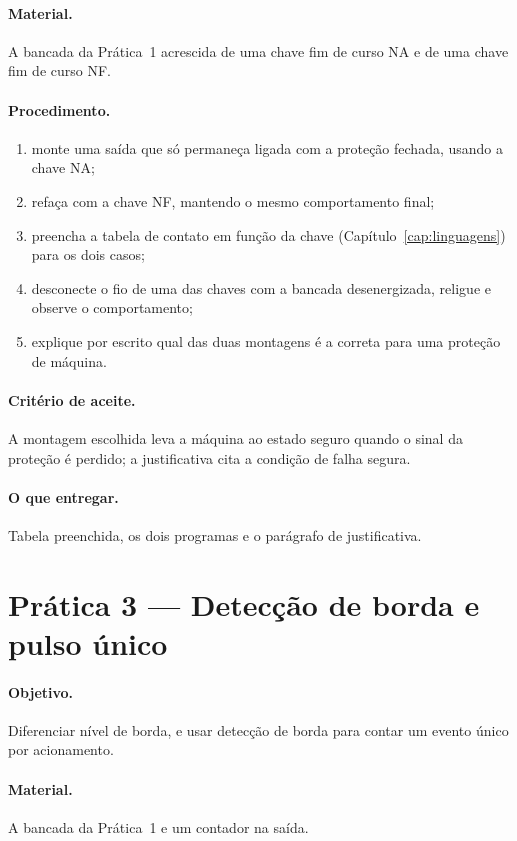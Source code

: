 \paragraph{Material.} A bancada da Prática~1 acrescida de uma chave fim de curso NA e de uma chave
fim de curso NF.

\paragraph{Procedimento.}
\begin{enumerate}
  \item monte uma saída que só permaneça ligada com a proteção fechada, usando a chave NA;
  \item refaça com a chave NF, mantendo o mesmo comportamento final;
  \item preencha a tabela de contato em função da chave (Capítulo~\ref{cap:linguagens}) para os dois
        casos;
  \item desconecte o fio de uma das chaves com a bancada desenergizada, religue e observe o
        comportamento;
  \item explique por escrito qual das duas montagens é a correta para uma proteção de máquina.
\end{enumerate}

\paragraph{Critério de aceite.} A montagem escolhida leva a máquina ao estado seguro quando o sinal
da proteção é perdido; a justificativa cita a condição de falha segura.

\paragraph{O que entregar.} Tabela preenchida, os dois programas e o parágrafo de justificativa.

\section{Prática 3 --- Detecção de borda e pulso único}

\paragraph{Objetivo.} Diferenciar nível de borda, e usar detecção de borda para contar um evento
único por acionamento.

\paragraph{Material.} A bancada da Prática~1 e um contador na saída.

